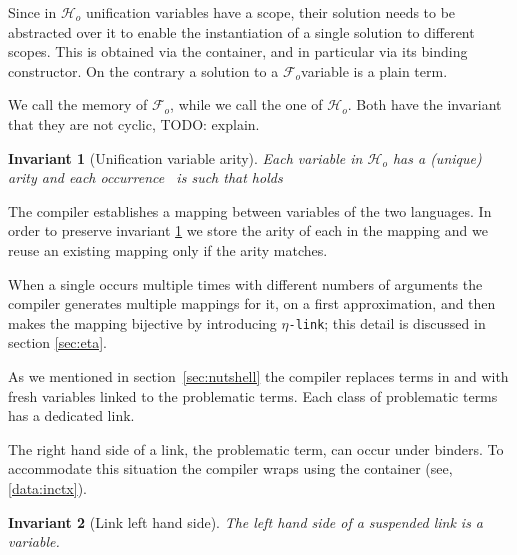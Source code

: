 \documentclass[sigconf,natbib=false,review]{acmart}
\newtheorem{invariant}{Invariant}
\newcommand{\linkMacro}[1]{\ensuremath{#1}\texttt{-link}\xspace}
\newcommand{\linketa} {\linkMacro{\eta}}
\newcommand{\Fo}{\ensuremath{\mathcal{F}_{\!o}\xspace}} %
\newcommand{\Ho}{\ensuremath{\mathcal{H}_o}\xspace}
\begin{document}
Since in \Ho unification variables have a scope, their solution needs to be
abstracted over it to enable the instantiation of a single
solution to different scopes. This is obtained via the 
container, and in particular via its  binding constructor.
On the contrary a solution to a \Fo variable is a plain term.




\noindent
We call  the memory of \Fo{}, while we call 
the one of \Ho.
Both have the invariant that they are not cyclic, TODO: explain.



\begin{invariant}[Unification variable arity]
  Each variable 
  in \Ho has a (unique) arity  and each occurrence~
   is such that  holds
  \label{inv:uvaarity}
\end{invariant}

\noindent
The compiler establishes a mapping between variables of the two languages.
In order to preserve invariant \ref{inv:uvaarity} we store the
arity of each  in the mapping and we reuse an existing
mapping only if the arity matches.




\noindent
When a single  occurs multiple times with different numbers
of arguments the compiler generates multiple mappings for it, on a first
approximation, and then makes the mapping bijective by introducing
\linketa; this detail is discussed in section \ref{sec:eta}.

As we mentioned in section~\ref{sec:nutshell} the compiler
replaces terms in \maybeeta and \notllambda with fresh variables
linked to the problematic terms. Each class of problematic terms
has a dedicated link.



\noindent
The right hand side of a link, the problematic term, can occur under binders.
To accommodate this situation the compiler wraps  using
the  container (see, \ref{data:inctx}).

\begin{invariant}[Link left hand side]\label{inv:linklhs}
  The left hand side of a suspended link
  is a variable.
\end{invariant}
\end{document}
